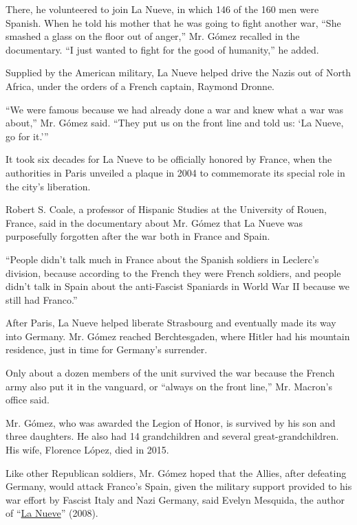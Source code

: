There, he volunteered to join La Nueve, in which 146 of the 160 men were
Spanish. When he told his mother that he was going to fight another war,
``She smashed a glass on the floor out of anger,'' Mr. Gómez recalled in
the documentary. ``I just wanted to fight for the good of humanity,'' he
added.

Supplied by the American military, La Nueve helped drive the Nazis out
of North Africa, under the orders of a French captain, Raymond Dronne.

``We were famous because we had already done a war and knew what a war
was about,'' Mr. Gómez said. ``They put us on the front line and told
us: `La Nueve, go for it.'''

It took six decades for La Nueve to be officially honored by France,
when the authorities in Paris unveiled a plaque in 2004 to commemorate
its special role in the city's liberation.

Robert S. Coale, a professor of Hispanic Studies at the University of
Rouen, France, said in the documentary about Mr. Gómez that La Nueve was
purposefully forgotten after the war both in France and Spain.

``People didn't talk much in France about the Spanish soldiers in
Leclerc's division, because according to the French they were French
soldiers, and people didn't talk in Spain about the anti-Fascist
Spaniards in World War II because we still had Franco.''

After Paris, La Nueve helped liberate Strasbourg and eventually made its
way into Germany. Mr. Gómez reached Berchtesgaden, where Hitler had his
mountain residence, just in time for Germany's surrender.

Only about a dozen members of the unit survived the war because the
French army also put it in the vanguard, or ``always on the front
line,'' Mr. Macron's office said.

Mr. Gómez, who was awarded the Legion of Honor, is survived by his son
and three daughters. He also had 14 grandchildren and several
great-grandchildren. His wife, Florence López, died in 2015.

Like other Republican soldiers, Mr. Gómez hoped that the Allies, after
defeating Germany, would attack Franco's Spain, given the military
support provided to his war effort by Fascist Italy and Nazi Germany,
said Evelyn Mesquida, the author of
``\href{https://www.casadellibro.com/libro-la-nueve-los-espanoles-que-liberaron-paris/9788466659352/3019252}{La
Nueve}'' (2008).

